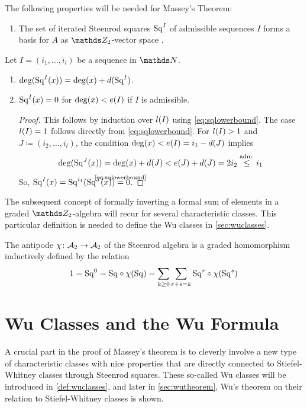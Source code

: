 \begin{Rem}\label{rem:sq}
  The following properties will be needed for Massey's Theorem:
  \begin{enumerate}
  \item The set of iterated Steenrod squares $\mathrm{Sq}^{I}$ of admissible
    sequences $I$ forms a basis for $A$ as $\Zmod2$-vector space
    \cite[Chap.~6, Theorem~1]{mosher}.
  \end{enumerate}
  Let $I=(i_1,\dotsc,i_l)$ be a sequence in $\Nat$.
  \begin{enumerate}[resume*]
  \item $\deg(\mathrm{Sq}^{I}(x)) = \deg(x) + d(\mathrm{Sq}^{I})$.
  \item\label{item:squpperboundgeneral} $\mathrm{Sq}^{I}(x) = 0$ for  $\deg(x)<e(I)$ if $I$ is admissible.
    \begin{proof}
      This follows by induction over $l(I)$ using
      \eqref{eq:sqlowerbound}. The case $l(I)=1$ follows directly 
      from \eqref{eq:sqlowerbound}.
      For $l(I)>1$ and $J\coloneqq(i_2,\dotsc,i_l)$, the condition
      $\deg(x) < e(I)=i_1-d(J)$
      implies
      \begin{gather*}
        \deg(\mathrm{Sq}^{J}(x))
        = \deg(x)+d(J) < e(J)+d(J) = 2i_2
        \overset{\text{adm.}}\leq i_1
      \end{gather*}
      So,
      $\Sq I(x)=\Sq{i_1}(\Sq J(x)) \cequalsby{\eqref{eq:sqlowerbound}} 0$.
    \end{proof}
  \end{enumerate}
\end{Rem}

The subsequent concept of formally inverting a formal sum of elements
in a graded $\Zmod2$-algebra will recur for several characteristic
classes. This particular definition is needed to define the Wu classes
in \autoref{sec:wuclasses}. 
\begin{Def}\label{def:antipode}
  The antipode $\chi\colon \mathcal{A}_2\to\mathcal{A}_2$ of the Steenrod algebra is a
  graded homomorphism inductively defined by the relation
  \begin{gather*}
    1 = \mathrm{Sq}^{0}
    = \mathrm{Sq} \circ \chi(\mathrm{Sq})
    = \sum_{k\geq0}\sum_{r+s=k} \mathrm{Sq}^{r} \circ \chi(\mathrm{Sq}^{s})
  \end{gather*}
\end{Def}

\section{Wu Classes and the Wu Formula}\label{sec:wuclassesmain}
A crucial part in the proof of Massey's theorem is to cleverly involve
a new type of characteristic classes with nice properties that are
directly connected to Stiefel-Whitney classes through Steenrod
squares.
These so-called Wu classes will be introduced in
\autoref{def:wuclasses}, and later in \autoref{sec:wutheorem}, Wu's
theorem on their relation to Stiefel-Whitney classes is shown.

